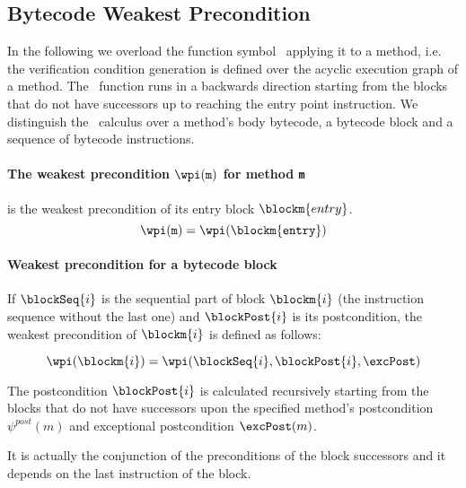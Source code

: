 

\subsection{Bytecode Weakest Precondition}\label{wpGraph}

In the following we overload the function symbol \wpi \ applying it to a method, i.e. the verification condition generation is defined over the acyclic execution graph of a method. 
The \wpi \ function runs in a backwards direction starting from the blocks that do not have successors up to reaching the entry point
 instruction. We distinguish the \wpi \ calculus over  a method's body bytecode, a bytecode block and a sequence of bytecode instructions.

\paragraph{The weakest precondition $\wpi(\tt{m})$ for method \texttt{m}} is the weakest precondition of its entry block $\blockm{entry}$. 
 $$\wpi(\tt{m}) = \wpi(\blockm{entry}) $$%
%

%


\paragraph{Weakest precondition for a bytecode block} If $\blockSeq{i}$ is the sequential part of block $\blockm{i}$ (the instruction sequence without the last one) and  $\blockPost{i}$ is its postcondition, the weakest precondition of $\blockm{i}$ is defined as follows:

$$ \wpi(\blockm{i}) = \wpi( \blockSeq{i}, \blockPost{i}, \excPost ) $$

The postcondition $\blockPost{i}$ is calculated recursively starting from the blocks that do not have successors upon the specified method's postcondition  $\psi^{post}(m)$ and exceptional postcondition $\excPost (m)$.
 
It is actually the conjunction of the preconditions
of the block successors and it depends on the last instruction of the block.

